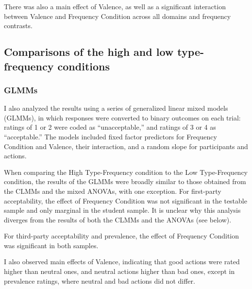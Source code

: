 \documentclass[
]{article}
\begin{document}
There was also a main effect of Valence, as well as a significant interaction between Valence and Frequency Condition across all domains and frequency contrasts.

\subsection{Comparisons of the high and low type-frequency conditions}\label{comparisons-of-the-high-and-low-type-frequency-conditions-2}

\subsubsection{GLMMs}\label{glmms-1}

I also analyzed the results using a series of generalized linear mixed models (GLMMs), in which responses were converted to binary outcomes on each trial: ratings of 1 or 2 were coded as ``unacceptable,'' and ratings of 3 or 4 as ``acceptable.'' The models included fixed factor predictors for Frequency Condition and Valence, their interaction, and a random slope for participants and actions.

When comparing the High Type-Frequency condition to the Low Type-Frequency condition, the results of the GLMMs were broadly similar to those obtained from the CLMMs and the mixed ANOVAs, with one exception. For first-party acceptability, the effect of Frequency Condition was not significant in the testable sample and only marginal in the student sample. It is unclear why this analysis diverges from the results of both the CLMMs and the ANOVAs (see below).

For third-party acceptability and prevalence, the effect of Frequency Condition was significant in both samples.

I also observed main effects of Valence, indicating that good actions were rated higher than neutral ones, and neutral actions higher than bad ones, except in prevalence ratings, where neutral and bad actions did not differ.
\end{document}
